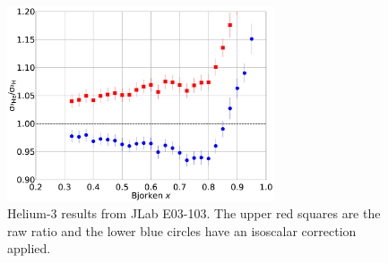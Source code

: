 \begin{figure}
\begin{center}
	\includegraphics[width=0.7\textwidth]{./EMC/fig/seely.eps}
	\caption{Helium-3 results from JLab E03-103. The upper red squares are the raw ratio and the lower blue circles have an isoscalar correction applied.\cite{e03103}}
	\label{seely_3he}
\end{center}
\end{figure}